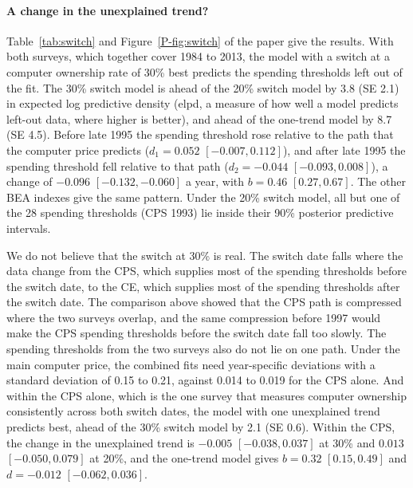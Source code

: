 \documentclass[11pt]{article}
\begin{document}
\begin{table}[!htbp]
\centering
\caption{The CPS against the CE in the five years that both surveys cover (1997, 1998, 2000, 2001, and 2003). Left: CPS against CE spending thresholds from the same specification (CE interpolated to the CPS month). Right: CE households (complete income reporters) fitted with spending imputed from income, with corrected spending, and with observed spending (point estimates).}
\label{tab:validation}
\resizebox{\textwidth}{!}{}
\end{table}

\paragraph{A change in the unexplained trend?} Table~\ref{tab:switch} and Figure~\ref{P-fig:switch} of the paper give the results. With both surveys, which together cover 1984 to 2013, the model with a switch at a computer ownership rate of 30\% best predicts the spending thresholds left out of the fit. The 30\% switch model is ahead of the 20\% switch model by 3.8 (SE 2.1) in expected log predictive density (elpd, a measure of how well a model predicts left-out data, where higher is better), and ahead of the one-trend model by 8.7 (SE 4.5). Before late 1995 the spending threshold rose relative to the path that the computer price predicts ($d_1 = 0.052$ $[-0.007, 0.112]$), and after late 1995 the spending threshold fell relative to that path ($d_2 = -0.044$ $[-0.093, 0.008]$), a change of $-0.096$ $[-0.132, -0.060]$ a year, with $b = 0.46$ $[0.27, 0.67]$. The other BEA indexes give the same pattern. Under the 20\% switch model, all but one of the 28 spending thresholds (CPS 1993) lie inside their 90\% posterior predictive intervals.

We do not believe that the switch at 30\% is real. The switch date falls where the data change from the CPS, which supplies most of the spending thresholds before the switch date, to the CE, which supplies most of the spending thresholds after the switch date. The comparison above showed that the CPS path is compressed where the two surveys overlap, and the same compression before 1997 would make the CPS spending thresholds before the switch date fall too slowly. The spending thresholds from the two surveys also do not lie on one path. Under the main computer price, the combined fits need year-specific deviations with a standard deviation of 0.15 to 0.21, against 0.014 to 0.019 for the CPS alone. And within the CPS alone, which is the one survey that measures computer ownership consistently across both switch dates, the model with one unexplained trend predicts best, ahead of the 30\% switch model by 2.1 (SE 0.6). Within the CPS, the change in the unexplained trend is $-0.005$ $[-0.038, 0.037]$ at 30\% and $0.013$ $[-0.050, 0.079]$ at 20\%, and the one-trend model gives $b = 0.32$ $[0.15, 0.49]$ and $d = -0.012$ $[-0.062, 0.036]$.
\end{document}
